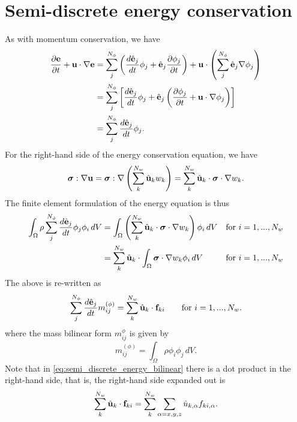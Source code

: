 \documentclass[11pt]{article}
\begin{document}
\section{Semi-discrete energy conservation}
As with momentum conservation, we have
\begin{align}
    \frac{\partial \mathbf{e}}{\partial t} + \mathbf{u} \cdot \nabla \mathbf{e} &= \sum_j^{N_\phi} \left ( \frac{d \hat{\mathbf{e}}_j}{d t} \phi_j + \hat{\mathbf{e}}_j \frac{\partial \phi_j}{\partial t} \right ) + \mathbf{u} \cdot \left ( \sum_j^{N_\phi} \hat{\mathbf{e}}_j \nabla \phi_j \right ) \nonumber \\
    &= \sum_j^{N_\phi} \left [ \frac{d \hat{\mathbf{e}}_j}{d t} \phi_j + \hat{\mathbf{e}}_j \left ( \frac{\partial \phi_j}{\partial t} + \mathbf{u} \cdot \nabla \phi_j \right ) \right ] \nonumber \\
    &= \sum_j^{N_\phi} \frac{d \hat{\mathbf{e}}_j}{d t} \phi_j.
\end{align}
For the right-hand side of the energy conservation equation, we have
\begin{equation}
    \bm \sigma : \nabla \mathbf{u} = \bm \sigma : \nabla \left ( \sum_k^{N_w} \hat{\mathbf{u}}_k w_k \right ) = \sum_k^{N_w} \hat{\mathbf{u}}_k \cdot \bm \sigma \cdot \nabla w_k.
\end{equation}
The finite element formulation of the energy equation is thus 
\begin{align}
    \int_\Omega \rho \sum_j^{N_\phi} \frac{d \hat{\mathbf{e}}_j}{d t} \phi_j \phi_i \, dV &= \int_\Omega \left ( \sum_k^{N_w} \hat{\mathbf{u}}_k \cdot \bm \sigma \cdot \nabla w_k \right ) \phi_i \, dV &\text{for } i = 1,...,N_w \nonumber \\
    &=\sum_k^{N_w} \hat{\mathbf{u}}_k \cdot \int_\Omega \bm \sigma \cdot \nabla w_k \phi_i \, dV &\text{for } i = 1,...,N_w
\end{align}
The above is re-written as
\begin{equation}
    \label{eq:semi_discrete_energy_bilinear}
    \sum_j^{N_\phi} \frac{d \hat{\mathbf{e}}_j}{d t} m^{(\phi)}_{ij} = \sum_k^{N_w} \hat{\mathbf{u}}_k \cdot \mathbf{f}_{ki} \qquad \text{for } i = 1,...,N_w.
\end{equation}
where the mass bilinear form $m^{\phi}_{ij}$ is given by 
\begin{equation}
    m^{(\phi)}_{ij} = \int_\Omega \rho \phi_i \phi_j \, dV.
\end{equation}
Note that in \cref{eq:semi_discrete_energy_bilinear} there is a dot product in the right-hand side, that is, the right-hand side expanded out is  
\begin{equation}
    \sum_k^{N_w} \hat{\mathbf{u}}_k \cdot \mathbf{f}_{ki} = \sum_k^{N_w} \sum_{\alpha=x,y,z} \hat{u}_{k,\alpha} f_{ki,\alpha}.
\end{equation}
\end{document}

